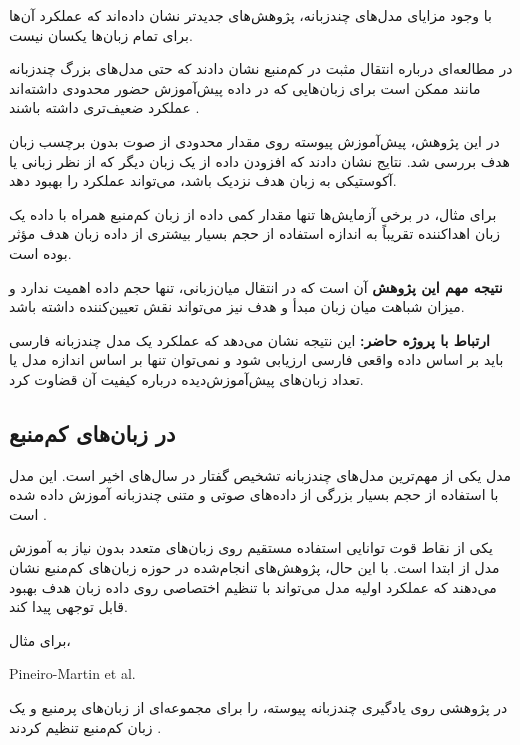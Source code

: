 با وجود مزایای مدل‌های چندزبانه، پژوهش‌های جدیدتر نشان داده‌اند
که عملکرد آن‌ها برای تمام زبان‌ها یکسان نیست.

در مطالعه‌ای درباره انتقال مثبت در  کم‌منبع نشان دادند که
حتی مدل‌های بزرگ چندزبانه مانند
ممکن است برای زبان‌هایی که در داده پیش‌آموزش حضور محدودی
داشته‌اند عملکرد ضعیف‌تری داشته باشند
\cite{san2024positive}.

در این پژوهش، پیش‌آموزش پیوسته
روی مقدار محدودی از صوت بدون برچسب زبان هدف بررسی شد.
نتایج نشان دادند که افزودن داده از یک زبان دیگر که از نظر
زبانی یا آکوستیکی به زبان هدف نزدیک باشد، می‌تواند عملکرد را
بهبود دهد.

برای مثال، در برخی آزمایش‌ها تنها مقدار کمی داده از زبان
کم‌منبع همراه با داده یک زبان اهداکننده
تقریباً به اندازه استفاده از حجم بسیار بیشتری از داده زبان
هدف مؤثر بوده است.

\textbf{نتیجه مهم این پژوهش} آن است که در انتقال میان‌زبانی،
تنها حجم داده اهمیت ندارد و میزان شباهت میان زبان مبدأ و هدف
نیز می‌تواند نقش تعیین‌کننده داشته باشد.

\textbf{ارتباط با پروژه حاضر:}
این نتیجه نشان می‌دهد که عملکرد یک مدل چندزبانه فارسی باید
بر اساس داده واقعی فارسی ارزیابی شود و نمی‌توان تنها بر اساس
اندازه مدل یا تعداد زبان‌های پیش‌آموزش‌دیده درباره کیفیت آن
قضاوت کرد.


\subsection{ در زبان‌های کم‌منبع}

مدل
یکی از مهم‌ترین مدل‌های چندزبانه تشخیص گفتار در سال‌های اخیر
است.
این مدل با استفاده از حجم بسیار بزرگی از داده‌های صوتی و متنی
چندزبانه آموزش داده شده است
\cite{radford2022whisper}.

یکی از نقاط قوت  توانایی استفاده مستقیم روی زبان‌های
متعدد بدون نیاز به آموزش مدل از ابتدا است.
با این حال، پژوهش‌های انجام‌شده در حوزه زبان‌های کم‌منبع نشان
می‌دهند که عملکرد اولیه مدل می‌تواند با تنظیم اختصاصی روی
داده زبان هدف بهبود قابل توجهی پیدا کند.

برای مثال،
\begin{latin}Pineiro-Martin et al.\end{latin}
در پژوهشی روی یادگیری چندزبانه پیوسته،  را برای مجموعه‌ای
از زبان‌های پرمنبع و یک زبان کم‌منبع تنظیم کردند
\cite{pineiro2024weighted}.

